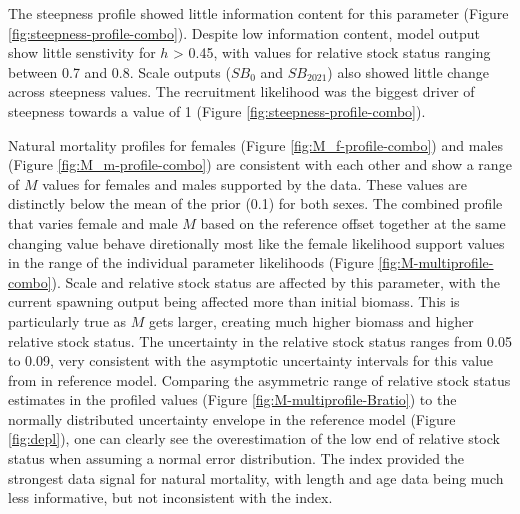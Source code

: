 \documentclass[11pt,
  english,
  a4paper,
]{article}
\begin{document}
\leavevmode\tagmcend\tagstructend\par


The steepness profile showed little information content for this parameter (Figure \ref{fig:steepness-profile-combo}). Despite low information content, model output show little senstivity for {\(h\)\leavevmode\tagmcend\tagstructend} \textgreater{} 0.45, with values for relative stock status ranging between 0.7 and 0.8. Scale outputs ({\(SB_0\)\leavevmode\tagmcend\tagstructend} and {\(SB_2021\)\leavevmode\tagmcend\tagstructend}) also showed little change across steepness values. The recruitment likelihood was the biggest driver of steepness towards a value of 1 (Figure \ref{fig:steepness-profile-combo}).

\leavevmode\tagmcend\tagstructend\par


Natural mortality profiles for females (Figure \ref{fig:M_f-profile-combo}) and males (Figure \ref{fig:M_m-profile-combo}) are consistent with each other and show a range of {\(M\)\leavevmode\tagmcend\tagstructend} values for females and males supported by the data. These values are distinctly below the mean of the prior (0.1) for both sexes. The combined profile that varies female and male {\(M\)\leavevmode\tagmcend\tagstructend} based on the reference offset together at the same changing value behave diretionally most like the female likelihood support values in the range of the individual parameter likelihoods (Figure \ref{fig:M-multiprofile-combo}). Scale and relative stock status are affected by this parameter, with the current spawning output being affected more than initial biomass. This is particularly true as {\(M\)\leavevmode\tagmcend\tagstructend} gets larger, creating much higher biomass and higher relative stock status. The uncertainty in the relative stock status ranges from 0.05 to 0.09, very consistent with the asymptotic uncertainty intervals for this value from in reference model. Comparing the asymmetric range of relative stock status estimates in the profiled values (Figure \ref{fig:M-multiprofile-Bratio}) to the normally distributed uncertainty envelope in the reference model (Figure \ref{fig:depl}), one can clearly see the overestimation of the low end of relative stock status when assuming a normal error distribution. The index provided the strongest data signal for natural mortality, with length and age data being much less informative, but not inconsistent with the index.
\end{document}
